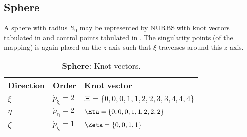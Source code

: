 \subsection{Sphere}
\label{Sec2:NURBSdataSphere}
A sphere with radius $R_0$ may be represented by NURBS with knot vectors tabulated in  and control points tabulated in . The singularity points (of the mapping) is again placed on the $z$-axis such that $\xi$ traverses around this $z$-axis.
\begin{table}
	\centering
	\caption{\textbf{Sphere}: Knot vectors.}
	\label{tab:sphereKnotvectors}
	\begin{tabular}{l l l}
		\toprule
		Direction	& 	Order	& 	Knot vector\\
		\hline
		$\xi$		&	$\check{p}_\upxi=2$	&	$\Xi = \{0, 0, 0, 1, 1, 2, 2, 3, 3, 4, 4, 4\}$	\\
		$\eta$		&	$\check{p}_\upeta=2$	&	$\Eta = \{0, 0, 0, 1, 1, 2, 2, 2\}$					\\
		$\zeta$		&	$\check{p}_\upzeta=1$	&	$\Zeta = \{0, 0, 1, 1\}$						\\
		\bottomrule
	\end{tabular}
\end{table}
